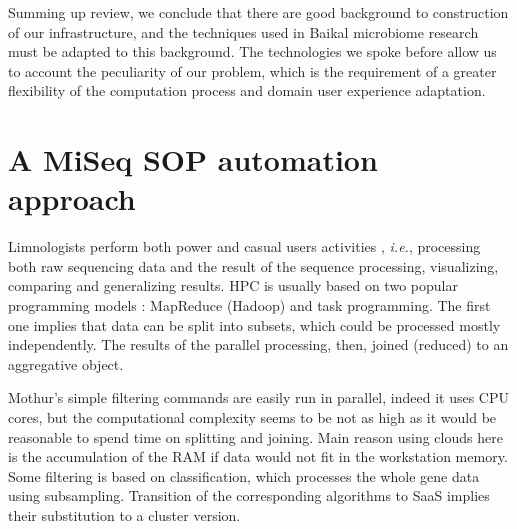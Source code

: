 \documentclass[a4paper]{jpconf}
\begin{document}
Summing up review, we conclude that there are good background to construction of our infrastructure, and the techniques used in Baikal microbiome research must be adapted to this background. The technologies we spoke before allow us to account the peculiarity of our problem, which is the requirement of a greater flexibility of the computation process and domain user experience adaptation.







\section{A MiSeq SOP automation approach}
\label{sec:proc-mod}

Limnologists perform both power and casual users activities \cite{guo16}, \emph{i.e.}, processing both raw sequencing data and the result of the sequence processing, visualizing, comparing and generalizing results. HPC is usually based on two popular programming models \cite{guo16}: MapReduce (Hadoop) and task programming. The first one implies that data can be split into subsets, which could be processed mostly independently. The results of the parallel processing, then, joined (reduced) to an aggregative object.

 Mothur's simple filtering commands are easily run in parallel, indeed it uses CPU cores, but the computational complexity seems to be not as high as it would be reasonable to spend time on splitting and joining.  Main reason using clouds here is the accumulation of the RAM if data would not fit in the workstation memory. %
Some filtering is based on classification, which processes the whole gene data using subsampling.  Transition of the corresponding algorithms to SaaS implies their substitution to a cluster version.
\end{document}
